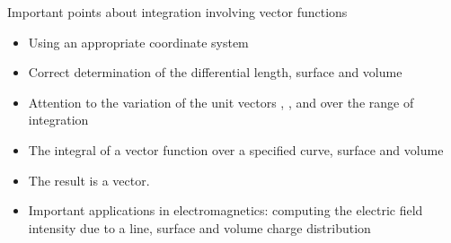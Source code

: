 \begin{ELremark}{}

Important points about integration involving vector functions

\begin{itemize}
\tightlist
\item
  Using an appropriate coordinate system
\item
  Correct determination of the differential length, surface and volume
\item
  Attention to the variation of the unit vectors , , \ELim{\uvec{\theta}} and \ELim{\uvec{\phi}} over the range of integration
\end{itemize}

\end{ELremark}

\begin{ELunit}

\begin{itemize}
\tightlist
\item
  The integral of a vector function over a specified curve, surface and volume
\end{itemize}


\begin{itemize}
\tightlist
\item
  The result is a vector.
\item
  Important applications in electromagnetics: computing the electric field intensity due to a line, surface and volume charge distribution
\end{itemize}


\end{ELunit}


